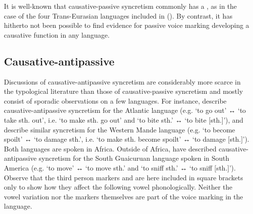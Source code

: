 It is well-known that causative-passive syncretism commonly has a , as in the case of the four Trans-Eurasian languages included in  (). By contrast, it has hitherto not been possible to find evidence for passive voice marking developing a causative function in any language.

\subsection{Causative-antipassive} \label{sec:simple-syncretism:caus-antp}
Discussions of causative-antipassive syncretism are considerably more scarce in the typological literature than those of causative-passive syncretism and mostly consist of sporadic observations on a few languages. For instance, \cite[295ff.]{creissels:nouguier-voisin:2008} describe causative-antipassive syncretism for the Atlantic language  (e.g.  ‘to go out’ ↔  ‘to take sth. out’, i.e. ‘to make sth. go out’ and  ‘to bite sth.’ ↔  ‘to bite [sth.]’), and \cite[20]{creissels:diagne:2013} describe similar syncretism for the Western Mande language  (e.g.  ‘to become spoilt’ ↔  ‘to damage sth.’, i.e. ‘to make sth. become spoilt’ ↔  ‘to damage [sth.]’). Both languages are spoken in Africa. Outside of Africa, \cite[240, 244f.]{juarez:gonzalez:2017} have described causative-antipassive syncretism for the South Guaicuruan language  spoken in South America (e.g.  ‘to move’ ↔  ‘to move sth.’ and  ‘to sniff sth.’ ↔  ‘to sniff [sth.]’). Observe that the third person  markers  and  are here included in square brackets only to show how they affect the following vowel phonologically. Neither the vowel variation nor the  markers themselves are part of the voice marking in the language.

